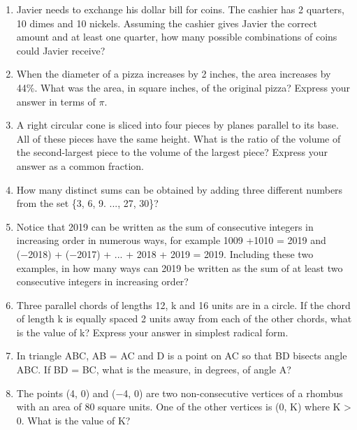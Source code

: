 \documentclass[12pt]{article}
\begin{document}
\begin{enumerate}
\item Javier needs to exchange his dollar bill for
coins. The cashier has 2 quarters, 10 dimes
and 10 nickels. Assuming the cashier gives
Javier the correct amount and at least one
quarter, how many possible combinations of
coins could Javier receive?
\vspace{1cm}
\item When the diameter of a pizza increases by 2 inches, the area
increases by 44\%. What was the area, in square inches, of
the original pizza? Express your answer in terms of $\pi$.
\vspace{1cm}
\item A right circular cone is sliced into four pieces
by planes parallel to its base. All of these pieces have the same
height. What is the ratio of the volume of
the second-largest piece to the volume of
the largest piece? Express your answer as a
common fraction.
\vspace{1cm}
\item How many distinct sums can be obtained by adding three
different numbers from the set \{3, 6, 9. ..., 27, 30\}?
\vspace{1cm}
\item Notice that 2019 can be written as the sum of consecutive integers in increasing order in numerous ways, for example 1009 +1010 = 2019 and (−2018) + (−2017) + ... + 2018 + 2019 = 2019. Including these two examples, in how many ways can 2019 be written as the sum of at least two consecutive integers in increasing order?
\vspace{1cm}
\item Three parallel chords of lengths 12, k and 16 units are in a circle.
If the chord of length k is equally spaced 2 units away from each of the other chords, what is the value of k? Express your answer in simplest radical form.
\vspace{1cm}


\item In triangle ABC, AB = AC and D is a point on AC so that
BD bisects angle ABC. If BD = BC, what is the measure, in
degrees, of angle A?

\vspace{1cm}

\item The points (4, 0) and (−4, 0) are two non-consecutive vertices
of a rhombus with an area of 80 square units. One of the other
vertices is (0, K) where K > 0. What is the value of K?
\vspace{1cm}


\end{enumerate}
\end{document}
